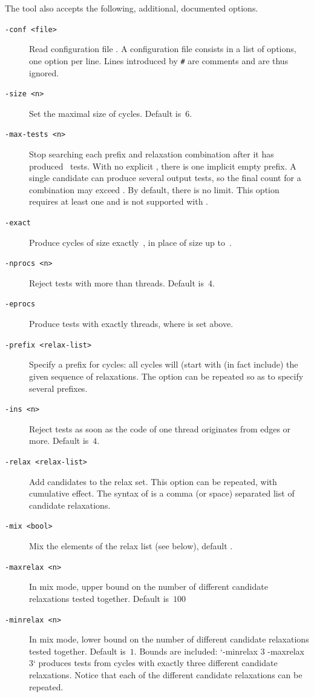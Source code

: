 The tool \diy{} also accepts the following, additional, documented options.
\begin{description}
\item[{\tt -conf <file>}] Read configuration file .
A configuration file consists in a list of options, one option per line.
Lines introduced by \verb+#+ are comments and are thus ignored.
\item[{\tt -size <n>}] Set the maximal size of cycles. Default is~$6$.
\item[{\tt -max-tests <n>}] Stop searching each prefix and relaxation
combination after it has produced~ tests. With no explicit
, there is one implicit empty prefix. A single candidate can
produce several output tests, so the final count for a combination may exceed
. By default, there is no limit. This option requires at least one
 and is not supported with .
\item[{\tt -exact}] Produce cycles of size exactly~,
in place of size up to~.
\item[{\tt -nprocs <n>}] Reject tests with more than  threads.
Default is~$4$.
\item[{\tt -eprocs}] Produce tests with exactly 
threads, where  is set above.
\item[{\tt -prefix <relax-list>}] Specify a prefix for cycles: all cycles will (start with (in fact include) the given sequence of relaxations. The option can be repeated so as to specify several prefixes.
\item[{\tt -ins <n>}] Reject tests as soon as the code of one thread
originates from  edges or more. Default is~$4$.
\item[{\tt -relax <relax-list>}] Add candidates to the relax set.  This option can be repeated, with cumulative effect.
The syntax of  is a comma (or space)
separated list of candidate relaxations.
\item[{\tt -mix <bool>}] Mix the elements of the relax list
(see below), default .
\item[{\tt -maxrelax <n>}]
In mix mode, upper bound on the number of different candidate
relaxations tested together.
Default is~$100$
\item[{\tt -minrelax <n>}]
In mix mode, lower bound on the number of different candidate
relaxations tested together.
Default is~$1$. Bounds are included: `-minrelax 3 -maxrelax 3` produces tests from cycles with exactly three different candidate relaxations. Notice that each of the different candidate relaxations can be repeated.

\end{description}
